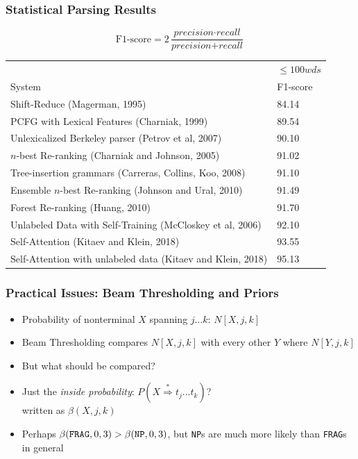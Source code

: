 \begin{frame}
\frametitle{Statistical Parsing Results}
\begin{center}
\footnotesize
\[ \textrm{F1-score} = 2 \frac{\textit{precision} \cdot \textit{recall}}{\textit{precision} + \textit{recall}} \]
\begin{tabular}{|p{7cm}|l|}
\hline
  & $\leq 100 wds$  \\
System & F1-score \\
\hline
Shift-Reduce (Magerman, 1995)   & 84.14 \\
PCFG with Lexical Features (Charniak, 1999)   & 89.54 \\
Unlexicalized Berkeley parser (Petrov et al, 2007) & 90.10 \\
$n$-best Re-ranking (Charniak and Johnson, 2005) & 91.02 \\
Tree-insertion grammars (Carreras, Collins, Koo, 2008) & 91.10 \\
Ensemble $n$-best Re-ranking (Johnson and Ural, 2010) & 91.49 \\
Forest Re-ranking (Huang, 2010) & 91.70 \\
Unlabeled Data with Self-Training (McCloskey et al, 2006) & 92.10 \\
\hline
Self-Attention (Kitaev and Klein, 2018) & 93.55 \\
Self-Attention with unlabeled data (Kitaev and Klein, 2018) & 95.13 \\
\hline
\end{tabular}
\end{center}
\end{frame}

\begin{frame}
\frametitle{Practical Issues: Beam Thresholding and Priors}
\begin{itemize}
\item Probability of nonterminal $X$ spanning $j \ldots k$:
$N[X,j,k]$
\item Beam Thresholding compares $N[X,j,k]$ with every other $Y$
where $N[Y,j,k]$
\item But what should be compared?
\item Just the {\em inside probability}: $P(X \stackrel{*}{\Rightarrow} t_j
\ldots t_k)$?\\
written as $\beta(X, j, k)$
\item Perhaps $\beta(\mbox{\tt FRAG}, 0, 3) > \beta(\mbox{\tt NP}, 0,
3)$, but {\tt NP}s are much more likely than {\tt FRAG}s in general
\end{itemize}
\end{frame}

